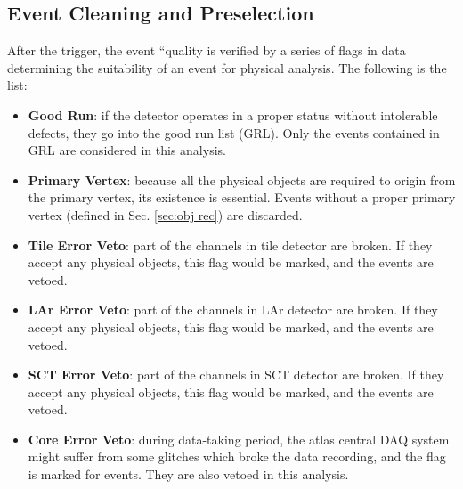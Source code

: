 \subsection{Event Cleaning and Preselection}
After the trigger, the event ``quality is verified by a series of flags in data determining the suitability of an event for physical analysis. The following is the list:
\begin{itemize}
	\item {\bf Good Run}: if the detector operates in a proper status without intolerable defects, they go into the good run list (GRL). Only the events contained in GRL are considered in this analysis. 
	\item {\bf Primary Vertex}: because all the physical objects are required to origin from the primary vertex, its existence is essential. Events without a proper primary vertex (defined in Sec. \ref{sec:obj rec}) are discarded.
	\item {\bf Tile Error Veto}: part of the channels in tile detector are broken. If they accept any physical objects, this flag would be marked, and the events are vetoed.
	\item {\bf LAr Error Veto}: part of the channels in LAr detector are broken. If they accept any physical objects, this flag would be marked, and the events are vetoed.
	\item {\bf SCT Error Veto}: part of the channels in SCT detector are broken. If they accept any physical objects, this flag would be marked, and the events are vetoed.
	\item {\bf Core Error Veto}: during data-taking period, the atlas central DAQ system might suffer from some glitches which broke the data recording, and the flag is marked for events. They are also vetoed in this analysis. 
\end{itemize}
